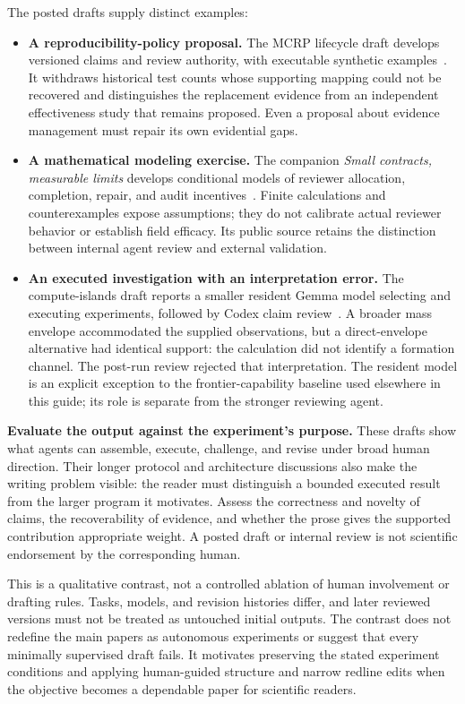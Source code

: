 \documentclass[aps,prd,reprint,nofootinbib]{revtex4-2}
\begin{document}
The posted drafts supply distinct examples:
\begin{itemize}
\item \textbf{A reproducibility-policy proposal.} The MCRP lifecycle draft develops versioned claims and review authority, with executable synthetic examples~\cite{AIXivLifecycle}. It withdraws historical test counts whose supporting mapping could not be recovered and distinguishes the replacement evidence from an independent effectiveness study that remains proposed. Even a proposal about evidence management must repair its own evidential gaps.
\item \textbf{A mathematical modeling exercise.} The companion \emph{Small contracts, measurable limits} develops conditional models of reviewer allocation, completion, repair, and audit incentives~\cite{AIXivContracts}. Finite calculations and counterexamples expose assumptions; they do not calibrate actual reviewer behavior or establish field efficacy. Its public source retains the distinction between internal agent review and external validation.
\item \textbf{An executed investigation with an interpretation error.} The compute-islands draft reports a smaller resident Gemma model selecting and executing experiments, followed by Codex claim review~\cite{AIXivIslands}. A broader mass envelope accommodated the supplied observations, but a direct-envelope alternative had identical support: the calculation did not identify a formation channel. The post-run review rejected that interpretation. The resident model is an explicit exception to the frontier-capability baseline used elsewhere in this guide; its role is separate from the stronger reviewing agent.
\end{itemize}

\textbf{Evaluate the output against the experiment's purpose.} These drafts show what agents can assemble, execute, challenge, and revise under broad human direction. Their longer protocol and architecture discussions also make the writing problem visible: the reader must distinguish a bounded executed result from the larger program it motivates. Assess the correctness and novelty of claims, the recoverability of evidence, and whether the prose gives the supported contribution appropriate weight. A posted draft or internal review is not scientific endorsement by the corresponding human.

This is a qualitative contrast, not a controlled ablation of human involvement or drafting rules. Tasks, models, and revision histories differ, and later reviewed versions must not be treated as untouched initial outputs. The contrast does not redefine the main papers as autonomous experiments or suggest that every minimally supervised draft fails. It motivates preserving the stated experiment conditions and applying human-guided structure and narrow redline edits when the objective becomes a dependable paper for scientific readers.
\end{document}
